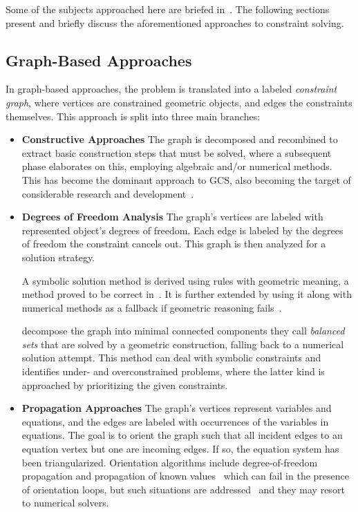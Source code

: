 Some of the subjects approached here are briefed in~\cite{Hoffmann:2005:BCS}.
The following sections present and briefly discuss the aforementioned approaches
to constraint solving.

\subsection{Graph-Based Approaches}%
\label{sec:intro.constraints.graph}

In graph-based approaches, the problem is translated into a labeled
\textit{constraint graph}, where vertices are constrained geometric objects, and
edges the constraints themselves.  This approach is split into three main
branches:

\begin{itemize}
  \item[] \textbf{Constructive Approaches} The graph is decomposed and
  recombined to extract basic construction steps that must be solved, where a
  subsequent phase elaborates on this, employing algebraic and/or numerical
  methods.  This has become the dominant approach to \ac{GCS}, also becoming the
  target of considerable research and
  development~\cite{Bettig:2011:GCSPC}.

  \item[] \textbf{Degrees of Freedom Analysis} The graph's vertices are labeled
  with represented object's degrees of freedom.  Each edge is labeled by the
  degrees of freedom the constraint cancels out.  This graph is then analyzed
  for a solution strategy.

  A symbolic solution method is derived using rules with geometric meaning, a
  method proved to be correct in~\cite{Kramer:1990:SGCS}.  It is further
  extended by using it along with numerical methods as a fallback if geometric
  reasoning fails~\cite{Hsu:1997:HCSEIGC}.

   decompose the graph into minimal connected components
  they call \textit{balanced sets} that are solved by a geometric construction,
  falling back to a numerical solution attempt.  This method can deal with
  symbolic constraints and identifies under- and overconstrained problems, where
  the latter kind is approached by prioritizing the given constraints.

  \item[] \textbf{Propagation Approaches} The graph's vertices represent
  variables and equations, and the edges are labeled with occurrences of the
  variables in equations.  The goal is to orient the graph such that all
  incident edges to an equation vertex but one are incoming edges.  If so, the
  equation system has been triangularized.  Orientation algorithms include
  degree-of-freedom propagation and propagation of known
  values~\cite{Freeman:1990:ICS,Veltkamp:1992:Geometric} which can fail in the
  presence of orientation loops, but such situations are
  addressed~\cite{Veltkamp:1992:Geometric} and they may resort to numerical
  solvers.
\end{itemize}

